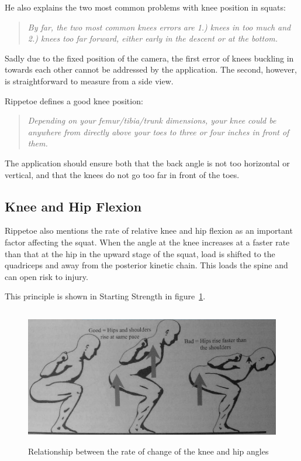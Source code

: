 He also explains the two most common problems with knee position in squats:

\begin{quote}
\emph{By far, the two most common knees errors are 1.) knees in too much and 2.) knees too far forward, either early in the descent or at the bottom.}
\end{quote}

Sadly due to the fixed position of the camera, the first error of knees buckling in towards each other cannot be addressed by the application. The second, however, is straightforward to measure from a side view.

Rippetoe defines a good knee position:

\begin{quote}
\emph{Depending on your femur/tibia/trunk dimensions, your knee could be anywhere from directly above your toes to three or four inches in front of them.}
\end{quote}

The application should ensure both that the back angle is not too horizontal or vertical, and that the knees do not go too far in front of the toes.

\subsection{Knee and Hip Flexion}

Rippetoe also mentions the rate of relative knee and hip flexion as an important factor affecting the squat. When the angle at the knee increases at a faster rate than that at the hip in the upward stage of the squat, load is shifted to the quadriceps and away from the posterior kinetic chain. This loads the spine and can open risk to injury.

This principle is shown in Starting Strength in figure~\ref{fig:rippetoe_flexion}.

\begin{figure}[H]
    \centering
	\includegraphics[height=6cm]{squat/images/rippetoe_knee_hip_flexion}
\caption{Relationship between the rate of change of the knee and hip angles}
\label{fig:rippetoe_flexion}
\end{figure}

